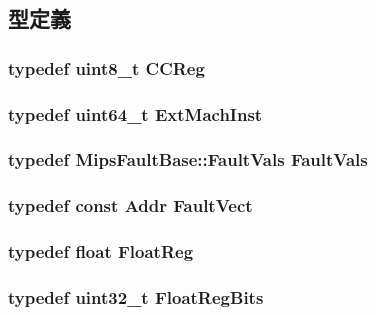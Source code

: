 \subsection{型定義}
\hypertarget{namespaceMipsISA_a5834599c0196ce4accda8049e7320621}{
\subsubsection[{CCReg}]{\setlength{\rightskip}{0pt plus 5cm}typedef uint8\_\-t {\bf CCReg}}}
\label{namespaceMipsISA_a5834599c0196ce4accda8049e7320621}
\hypertarget{namespaceMipsISA_aec686c38e40c7f794f1435591c15c275}{
\subsubsection[{ExtMachInst}]{\setlength{\rightskip}{0pt plus 5cm}typedef uint64\_\-t {\bf ExtMachInst}}}
\label{namespaceMipsISA_aec686c38e40c7f794f1435591c15c275}
\hypertarget{namespaceMipsISA_a76768ab93f86c2f9bfab9c40269382e7}{
\subsubsection[{FaultVals}]{\setlength{\rightskip}{0pt plus 5cm}typedef {\bf MipsFaultBase::FaultVals} {\bf FaultVals}}}
\label{namespaceMipsISA_a76768ab93f86c2f9bfab9c40269382e7}
\hypertarget{namespaceMipsISA_a5c26c9764cc05486454998efadf79833}{
\subsubsection[{FaultVect}]{\setlength{\rightskip}{0pt plus 5cm}typedef const {\bf Addr} {\bf FaultVect}}}
\label{namespaceMipsISA_a5c26c9764cc05486454998efadf79833}
\hypertarget{namespaceMipsISA_a449d6bb660f5ca613cf359f05d81a20f}{
\subsubsection[{FloatReg}]{\setlength{\rightskip}{0pt plus 5cm}typedef float {\bf FloatReg}}}
\label{namespaceMipsISA_a449d6bb660f5ca613cf359f05d81a20f}
\hypertarget{namespaceMipsISA_acc2693113a7cf1a4ff1c9d63b7de6451}{
\subsubsection[{FloatRegBits}]{\setlength{\rightskip}{0pt plus 5cm}typedef {\bf uint32\_\-t} {\bf FloatRegBits}}}
